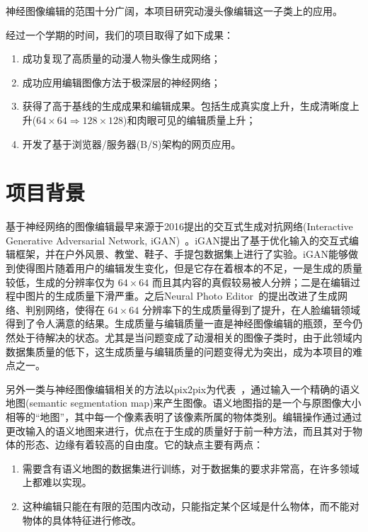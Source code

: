 \documentclass[a4paper,12pt,UTF8]{ctexart}
\begin{document}

神经图像编辑的范围十分广阔，本项目研究动漫头像编辑这一子类上的应用。

经过一个学期的时间，我们的项目取得了如下成果：

\begin{enumerate}
  \item 成功复现了高质量的动漫人物头像生成网络；
  \item 成功应用编辑图像方法于极深层的神经网络；
  \item 获得了高于基线的生成成果和编辑成果。包括生成真实度上升，生成清晰度上升($64 \times 64 \Rightarrow 128 \times 128$)和肉眼可见的编辑质量上升；
  \item 开发了基于浏览器/服务器(B/S)架构的网页应用。
\end{enumerate}

\section{项目背景}

基于神经网络的图像编辑最早来源于2016提出的交互式生成对抗网络(Interactive Generative Adversarial Network, iGAN)~\cite{Zhu2016Generative}。iGAN提出了基于优化输入的交互式编辑框架，并在户外风景、教堂、鞋子、手提包数据集上进行了实验。iGAN能够做到使得图片随着用户的编辑发生变化，但是它存在着根本的不足，一是生成的质量较低，生成的分辨率仅为 $64\times64$ 而且其内容的真假较易被人分辨；二是在编辑过程中图片的生成质量下滑严重。之后Neural Photo Editor~\cite{Brock2016Neural}的提出改进了生成网络、判别网络，使得在 $64\times64$ 分辨率下的生成质量得到了提升，在人脸编辑领域得到了令人满意的结果。生成质量与编辑质量一直是神经图像编辑的瓶颈，至今仍然处于待解决的状态。尤其是当问题变成了动漫相关的图像子类时，由于此领域内数据集质量的低下，这生成质量与编辑质量的问题变得尤为突出，成为本项目的难点之一。

另外一类与神经图像编辑相关的方法以pix2pix为代表~\cite{isola2016image}，通过输入一个精确的语义地图(semantic segmentation map)来产生图像。语义地图指的是一个与原图像大小相等的“地图”，其中每一个像素表明了该像素所属的物体类别。编辑操作通过通过更改输入的语义地图来进行，优点在于生成的质量好于前一种方法，而且其对于物体的形态、边缘有着较高的自由度。它的缺点主要有两点：
\begin{enumerate}
  \item 需要含有语义地图的数据集进行训练，对于数据集的要求非常高，在许多领域上都难以实现。
  \item 这种编辑只能在有限的范围内改动，只能指定某个区域是什么物体，而不能对物体的具体特征进行修改。
\end{enumerate}
\end{document}
